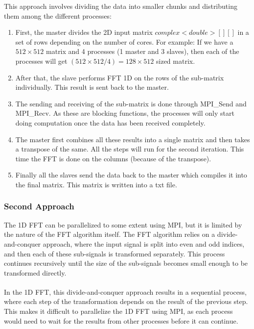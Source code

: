 \documentclass{article}
\begin{document}
This approach involves dividing the data into smaller chunks and distributing them among the different processes:
\begin{enumerate}
\item First, the master divides the 2D input matrix $complex<double>[][]$ in a set of rows depending on the number of cores. For example: If we have a $512\times512$ matrix and 4 processes (1 master and 3 slaves), then each of the processes will get $(512\times512/4) = 128\times512$ sized matrix.

\item After that, the slave performs FFT 1D on the rows of the sub-matrix individually. This result is sent back to the master.

\item The sending and receiving of the sub-matrix is done through MPI\_Send and MPI\_Recv. As these are blocking functions, the processes will only start doing computation once the data has been received completely.

\item The master first combines all these results into a single matrix and then takes a transpose of the same.
All the steps will run for the second iteration. This time the FFT is done on the columns (because of the transpose).

\item  Finally all the slaves send the data back to the master which compiles it into the final matrix. This matrix is written into a txt file. 
\end{enumerate}

\subsubsection{Second Approach}

The 1D FFT can be parallelized to some extent using MPI, but it is limited by the nature of the FFT algorithm itself. The FFT algorithm relies on a divide-and-conquer approach, where the input signal is split into even and odd indices, and then each of these sub-signals is transformed separately. This process continues recursively until the size of the sub-signals becomes small enough to be transformed directly.
\\\\
In the 1D FFT, this divide-and-conquer approach results in a sequential process, where each step of the transformation depends on the result of the previous step. This makes it difficult to parallelize the 1D FFT using MPI, as each process would need to wait for the results from other processes before it can continue.
\end{document}
